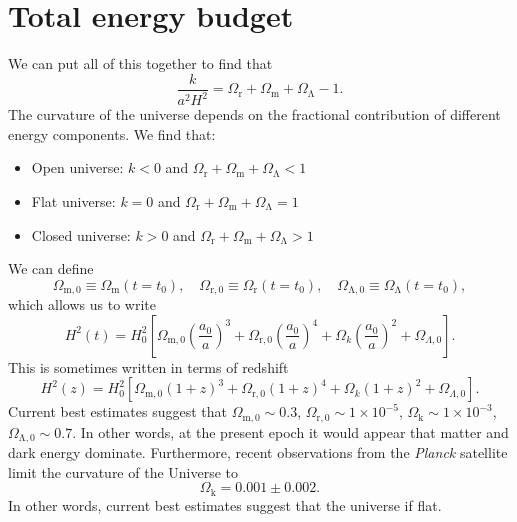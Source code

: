 \documentclass[a4paper,12pt]{article}
\theoremstyle{remark}
\newcommand{\mrm}[1]{\mathrm{#1}}
\renewcommand{\=}[1]{\stackrel{#1}{=}} %
\theoremstyle{plain}
\theoremstyle{definition}
\begin{document}
\section{Total energy budget}
We can put all of this together to find that 
\begin{equation}
\frac{k}{a^2 H^2} = \Omega _\mrm{r} + \Omega _\mrm{m} + \Omega _\mrm{\Lambda} - 1.
\end{equation}
The curvature of the universe depends on the fractional contribution of different energy components. We find that:
\vspace{-5mm}
\begin{itemize}
\item Open universe: $k < 0$ and $\Omega _\mrm{r} + \Omega _\mrm{m} + \Omega _\mrm{\Lambda} < 1$
\item Flat universe: $k = 0$ and $\Omega _\mrm{r} + \Omega _\mrm{m} + \Omega _\mrm{\Lambda} = 1$
\item Closed universe: $k > 0$ and $\Omega _\mrm{r} + \Omega _\mrm{m} + \Omega _\mrm{\Lambda} > 1$ 
\end{itemize}
We can define
\begin{equation}
\Omega _\mrm{m,0} \equiv \Omega _\mrm{m} (t=t_0), \quad \Omega _\mrm{r,0} \equiv \Omega _\mrm{r} (t=t_0), \quad \Omega _\mrm{\Lambda,0} \equiv \Omega _\mrm{\Lambda} (t=t_0),
\end{equation}
which allows us to write
\begin{equation}
H^{2}(t) = H_0^{2} \left[ \Omega _\mrm{m,0} \left( \frac{a_0}{a} \right)^{3} + \Omega _\mrm{r,0} \left( \frac{a_0}{a} \right)^{4} + \Omega _k \left( \frac{a_0}{a} \right)^{2} + \Omega _{\Lambda, 0} \right].
\end{equation}
This is sometimes written in terms of redshift
\begin{equation}
H^{2}(z) = H_0^{2} \left[ \Omega _\mrm{m,0} (1+z)^{3} + \Omega _\mrm{r,0} (1+z)^{4} + \Omega _{k} (1+z)^{2} + \Omega _{\Lambda, 0} \right]. 
\end{equation}
Current best estimates suggest that $\Omega _\mrm{m,0} \sim 0.3$, $\Omega _\mrm{r,0} \sim 1\times10^{-5}$, $\Omega _\mrm{k} \sim 1\times10^{-3}$, $\Omega _\mrm{\Lambda,0} \sim 0.7$. In other words, at the present epoch it would appear that matter and dark energy dominate. Furthermore, recent observations from the \textit{Planck} satellite limit the curvature of the Universe to
\begin{equation}
\Omega _\mrm{k} = 0.001 \pm 0.002.
\end{equation}
In other words, current best estimates suggest that the universe if flat.
\end{document}
